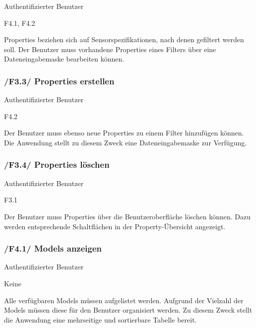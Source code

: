 \begin{description}[leftmargin=8em,style=nextline]
\item[Akteure] Authentifizierter Benutzer
\item[Includes] F4.1, F4.2
\item[Beschreibung]
Properties beziehen sich auf Sensorspezifikationen, nach denen gefiltert werden soll. Der Benutzer muss vorhandene Properties eines Filters über eine Dateneingabemaske bearbeiten können.
\end{description}

\subsubsection{/F3.3/ Properties erstellen}

\begin{description}[leftmargin=8em,style=nextline]
\item[Akteure] Authentifizierter Benutzer
\item[Includes] F4.2
\item[Beschreibung]
Der Benutzer muss ebenso neue Properties zu einem Filter hinzufügen können. Die Anwendung stellt zu diesem Zweck eine Dateneingabemaske zur Verfügung.
\end{description}

\subsubsection{/F3.4/ Properties löschen}

\begin{description}[leftmargin=8em,style=nextline]
\item[Akteure] Authentifizierter Benutzer
\item[Includes] F3.1
\item[Beschreibung]
Der Benutzer muss Properties über die Benutzeroberfläche löschen können. Dazu werden entsprechende Schaltflächen in der Property-Übersicht angezeigt.
\end{description}

\subsubsection{/F4.1/ Models anzeigen}

\begin{description}[leftmargin=8em,style=nextline]
\item[Akteure] Authentifizierter Benutzer
\item[Includes] Keine
\item[Beschreibung]
Alle verfügbaren Models müssen aufgelistet werden. Aufgrund der Vielzahl der Models müssen diese für den Benutzer organisiert werden. Zu diesem Zweck stellt die Anwendung eine mehrseitige und sortierbare Tabelle bereit. 
\end{description}

